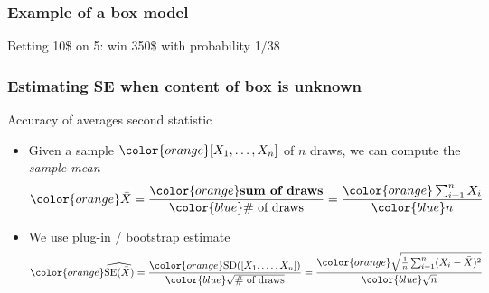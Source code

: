 \documentclass[handout]{beamer}
\begin{document}


   \begin{frame}
   \frametitle{Example of a box model}
   \begin{center}
   \end{center}
   Betting 10\$ on {\color{red} 5}: win 350\$ with probability 1/38
   \end{frame}


   \begin{frame} \frametitle{Estimating SE when content of box is unknown}

   \begin{block}
   {Accuracy of averages second statistic}
   \begin{itemize}
   \item Given a sample ${\color{orange}[X_1, \dots, X_n]}$ of $n$ draws, we can compute the {\em sample mean}
   $$
   {\color{orange} \bar{X}}  = \frac{{\color{orange} \text{\bf sum of draws}}}{{\color{blue} \text{$\#$ of draws}}}  = \frac{{\color{orange} \sum_{i=1}^n X_i}}{{\color{blue} n}}
   $$
   \item We use {\color{orange} plug-in / bootstrap} estimate
   $$
   {\color{orange}\widehat{ \text{SE}(\bar{X})}} = \frac{{\color{orange}\text{SD($[X_1, \dots, X_n]$)}}}{{\color{blue}\sqrt{ \text{$\#$ of draws}}}} =  \frac{{\color{orange} \sqrt{\frac{1}{n}\sum_{i=1}^n (X_i - \bar{X})^2}}}{\color{blue} \sqrt{n}}
   $$

   \end{itemize}
   \end{block}
   \end{frame}
\end{document}
